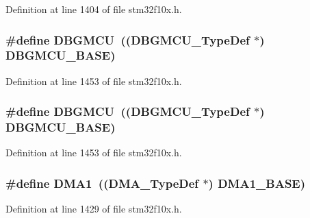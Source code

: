 Definition at line 1404 of file stm32f10x.\+h.

\subsubsection[{\texorpdfstring{D\+B\+G\+M\+CU}{DBGMCU}}]{\setlength{\rightskip}{0pt plus 5cm}\#define D\+B\+G\+M\+CU~(({\bf D\+B\+G\+M\+C\+U\+\_\+\+Type\+Def} $\ast$) {\bf D\+B\+G\+M\+C\+U\+\_\+\+B\+A\+SE})}\hypertarget{group___peripheral__declaration_ga92ec6d9ec2251fda7d4ce09748cd74b4}{}\label{group___peripheral__declaration_ga92ec6d9ec2251fda7d4ce09748cd74b4}


Definition at line 1453 of file stm32f10x.\+h.

\subsubsection[{\texorpdfstring{D\+B\+G\+M\+CU}{DBGMCU}}]{\setlength{\rightskip}{0pt plus 5cm}\#define D\+B\+G\+M\+CU~(({\bf D\+B\+G\+M\+C\+U\+\_\+\+Type\+Def} $\ast$) {\bf D\+B\+G\+M\+C\+U\+\_\+\+B\+A\+SE})}\hypertarget{group___peripheral__declaration_ga92ec6d9ec2251fda7d4ce09748cd74b4}{}\label{group___peripheral__declaration_ga92ec6d9ec2251fda7d4ce09748cd74b4}


Definition at line 1453 of file stm32f10x.\+h.

\subsubsection[{\texorpdfstring{D\+M\+A1}{DMA1}}]{\setlength{\rightskip}{0pt plus 5cm}\#define D\+M\+A1~(({\bf D\+M\+A\+\_\+\+Type\+Def} $\ast$) {\bf D\+M\+A1\+\_\+\+B\+A\+SE})}\hypertarget{group___peripheral__declaration_gacc16d2a5937f7585320a98f7f6b578f9}{}\label{group___peripheral__declaration_gacc16d2a5937f7585320a98f7f6b578f9}


Definition at line 1429 of file stm32f10x.\+h.

